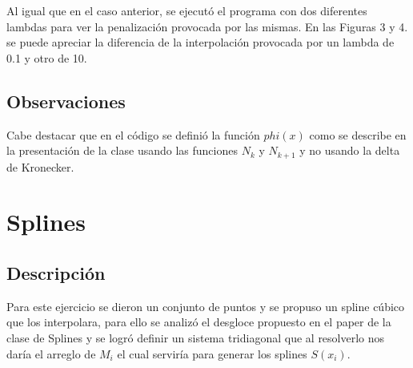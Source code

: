 \documentclass[12pt]{article}
\begin{document}
\begin{figure}[H]
	\centering
	\hfill
\end{figure}

Al igual que en el caso anterior, se ejecutó el programa con dos diferentes lambdas para ver la penalización provocada por las mismas. En las Figuras 3 y 4. se puede apreciar la diferencia de la interpolación provocada por un lambda de 0.1 y otro de 10.

\subsection{Observaciones}
Cabe destacar que en el código se definió la función $phi(x)$ como se describe en la presentación de la clase usando las funciones $N_k$ y $N_{k+1}$ y no usando la delta de Kronecker.

\section{Splines}
\subsection{Descripción}
Para este ejercicio se dieron un conjunto de puntos y se propuso un spline cúbico que los interpolara, para ello se analizó el desgloce propuesto en el paper de la clase de Splines y se logró definir un sistema tridiagonal que al resolverlo nos daría el arreglo de $M_i$ el cual serviría para generar los splines $S(x_i)$.
\end{document}
